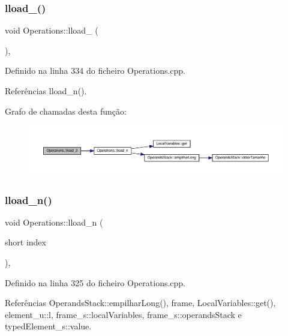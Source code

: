 \subsubsection{\texorpdfstring{lload\+\_()}{lload\_3()}}
{\footnotesize\ttfamily void Operations\+::lload\+\_ (\begin{DoxyParamCaption}{ }\end{DoxyParamCaption})\hspace{0.3cm}{\ttfamily [static]}, {\ttfamily [private]}}



Definido na linha 334 do ficheiro Operations.\+cpp.



Referências lload\+\_\+n().

Grafo de chamadas desta função\+:\nopagebreak
\begin{figure}[H]
\begin{center}
\leavevmode
\includegraphics[width=350pt]{classOperations_af2f8b1e41b734f43e73d9d6811eb427b_cgraph}
\end{center}
\end{figure}
\mbox{\label{classOperations_a4f70442aed776d9ccae4dfd379715cd4}} 
\subsubsection{\texorpdfstring{lload\+\_\+n()}{lload\_n()}}
{\footnotesize\ttfamily void Operations\+::lload\+\_\+n (\begin{DoxyParamCaption}\item[{short}]{index }\end{DoxyParamCaption})\hspace{0.3cm}{\ttfamily [static]}, {\ttfamily [private]}}



Definido na linha 325 do ficheiro Operations.\+cpp.



Referências Operands\+Stack\+::empilhar\+Long(), frame, Local\+Variables\+::get(), element\+\_\+u\+::l, frame\+\_\+s\+::local\+Variables, frame\+\_\+s\+::operands\+Stack e typed\+Element\+\_\+s\+::value.



